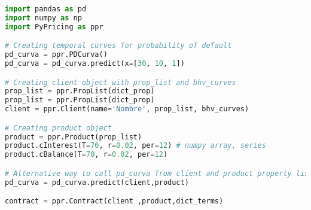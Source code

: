 
\begin{lstlisting}[language=Python, caption=Python example]
import pandas as pd
import numpy as np
import PyPricing as ppr

# Creating temporal curves for probability of default    
pd_curva = ppr.PDCurva()
pd_curva = pd_curva.predict(x=[30, 10, 1])

# Creating client object with prop_list and bhv_curves
prop_list = ppr.PropList(dict_prop)
prop_list = ppr.PropList(dict_prop)
client = ppr.Client(name='Nombre', prop_list, bhv_curves)

# Creating product object 
product = ppr.Product(prop_list)
product.cInterest(T=70, r=0.02, per=12) # numpy array, series
product.cBalance(T=70, r=0.02, per=12)

# Alternative way to call pd_curva from client and product property list
pd_curva = pd_curva.predict(client,product)

contract = ppr.Contract(client ,product,dict_terms)
\end{lstlisting}